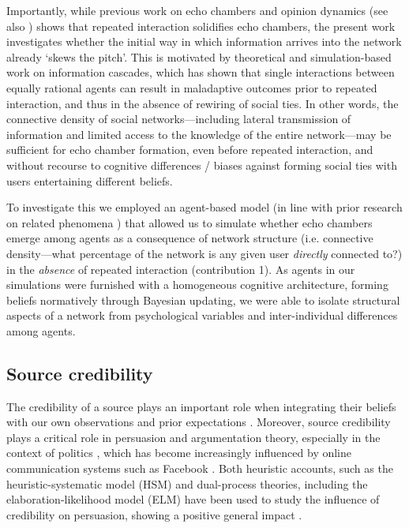 \documentclass[fleqn,10pt]{wlscirep}
\begin{document}
Importantly, while previous work on echo chambers \cite{madsen2018large, madsen2017growing} and opinion dynamics (see also \cite{lorenz2007continuous}) shows that repeated interaction solidifies echo chambers, the present work investigates whether the initial way in which information arrives into the network already `skews the pitch'. This is motivated by theoretical  \cite{bikhchandani1992theory} and simulation-based \cite{pilditch2017opinion} work on information cascades, which has shown that single interactions between equally rational agents can result in maladaptive outcomes prior to repeated interaction, and thus in the absence of rewiring of social ties. In other words, the connective density of social networks---including lateral transmission of information and limited access to the knowledge of the entire network---may be sufficient for echo chamber formation, even before repeated interaction, and without recourse to cognitive differences / biases against forming social ties with users entertaining different beliefs. 

To investigate this we employed an agent-based model (in line with prior research on related phenomena \cite{madsen2017growing, madsen2018large}) that allowed us to simulate whether echo chambers emerge among agents as a consequence of network structure (i.e. connective density---what percentage of the network is any given user \textit{directly} connected to?) in the \emph{absence} of repeated interaction (contribution 1). 
As agents in our simulations were furnished with a homogeneous cognitive architecture, forming beliefs normatively through Bayesian updating, we were able to isolate structural aspects of a network from psychological variables and inter-individual differences among agents. 

\subsection*{Source credibility}
The credibility of a source plays an important role when integrating their beliefs with our own observations and prior expectations \cite{cuddy2011dynamics, fiske2007universal}. Moreover, source credibility plays a critical role in persuasion and argumentation theory, especially in the context of politics \cite{housholder2014facebook, robinson1999measures, cialdini1993influence}, which has become increasingly influenced by online communication systems such as Facebook \cite{bail2016combining}. Both heuristic accounts, such as the heuristic-systematic model (HSM) \cite{chaiken1999heuristic} and dual-process theories, including the elaboration-likelihood model (ELM) \cite{petty1986elaboration} have been used to study the influence of credibility on persuasion, showing a positive general impact  \cite{chaiken1994heuristic}.%
\end{document}
